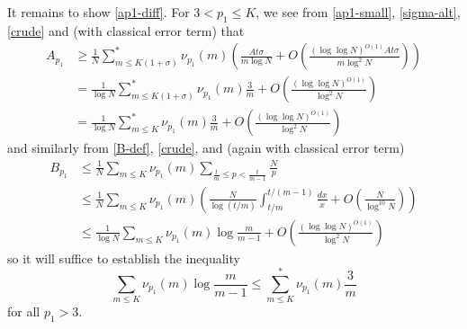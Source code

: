 \documentclass[12pt,a4paper,reqno]{amsart}
\numberwithin{equation}{section}
\theoremstyle{plain}
\theoremstyle{definition}
\begin{document}
It remains to show \eqref{ap1-diff}.  For $3 < p_1 \leq K$, we see from \eqref{ap1-small}, \eqref{sigma-alt}, \eqref{crude} and  (with classical error term) that
\begin{align*}
A_{p_1} &\geq \frac{1}{N} \sum_{m \leq K(1+\sigma)}^* \nu_{p_1}(m) \left( \frac{A t \sigma}{m \log N} + O\left( \frac{(\log\log N)^{O(1)}A t \sigma}{m \log^2 N} \right) \right) \\
&= \frac{1}{\log N} \sum_{m \leq K(1+\sigma)}^* \nu_{p_1}(m) \frac{3}{m}+ O\left( \frac{(\log\log N)^{O(1)}}{\log^2 N} \right) \\
&= \frac{1}{\log N} \sum_{m \leq K}^* \nu_{p_1}(m) \frac{3}{m}+ O\left( \frac{(\log\log N)^{O(1)}}{\log^2 N} \right) 
\end{align*}
and similarly from \eqref{B-def}, \eqref{crude}, and  (again with classical error term) 
\begin{align*}
  B_{p_1} &\leq
  \frac{1}{N} \sum_{m \leq K} \nu_{p_1}(m) \sum_{\frac{t}{m} \leq p < \frac{t}{m-1}} \frac{N}{p}  \\
  &\leq \frac{1}{N} \sum_{m \leq K} \nu_{p_1}(m) \left( \frac{N}{\log(t/m)} \int_{t/m}^{t/(m-1)} \frac{dx}{x} + O\left( \frac{N}{\log^{10} N} \right) \right) \\
  &\leq \frac{1}{\log N} \sum_{m \leq K} \nu_{p_1}(m) \log \frac{m}{m-1} + O\left( \frac{(\log\log N)^{O(1)}}{\log^2 N} \right)
\end{align*}
so it will suffice to establish the inequality
\begin{equation}\label{key-ineq} 
   \sum_{m \leq K} \nu_{p_1}(m) \log \frac{m}{m-1} \leq \sum_{m \leq K}^* \nu_{p_1}(m) \frac{3}{m}
\end{equation}
for all $p_1 > 3$.
  
\end{document}
